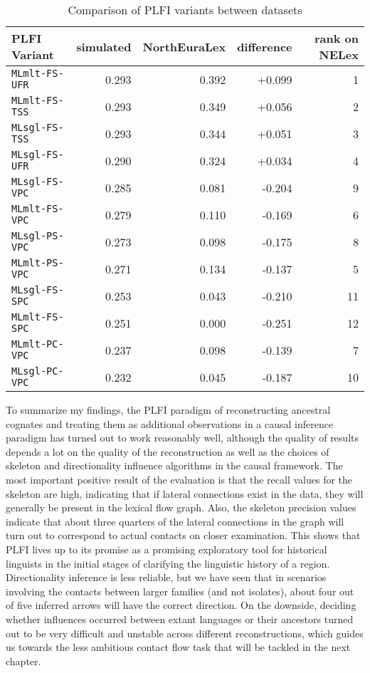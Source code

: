\begin{table}[t]
 \centering
 \begin{tabular}{lrrrr}
\hline \hline
PLFI Variant & simulated & NorthEuraLex & difference & rank on NELex\\ \hline
\texttt{MLmlt-FS-UFR} & 0.293 & 0.392 & +0.099 & 1\\  
\texttt{MLmlt-FS-TSS} & 0.293 & 0.349 & +0.056 & 2\\
\texttt{MLsgl-FS-TSS} & 0.293 & 0.344 & +0.051 & 3\\
\texttt{MLsgl-FS-UFR} & 0.290 & 0.324 & +0.034 & 4\\
\texttt{MLsgl-FS-VPC} & 0.285 & 0.081 & -0.204 & 9\\
\texttt{MLmlt-FS-VPC} & 0.279 & 0.110 & -0.169 & 6\\
\texttt{MLsgl-PS-VPC} & 0.273 & 0.098 & -0.175 & 8\\
\texttt{MLmlt-PS-VPC} & 0.271 & 0.134 & -0.137 & 5\\
\texttt{MLsgl-FS-SPC} & 0.253 & 0.043 & -0.210 & 11\\
\texttt{MLmlt-FS-SPC} & 0.251 & 0.000 & -0.251 & 12\\
\texttt{MLmlt-PC-VPC} & 0.237 & 0.098 & -0.139 & 7\\
\texttt{MLsgl-PC-VPC} & 0.232 & 0.045 & -0.187 & 10\\
  \hline
 \end{tabular}
 \caption{Comparison of PLFI variants between datasets}
 \label{variant-comparison-simulated-and-nelex}
\end{table}

To summarize my findings, the PLFI paradigm of reconstructing ancestral cognates and treating them as additional observations in a causal inference paradigm has turned out to work reasonably well, although the quality of results depends a lot on the quality of the reconstruction as well as the choices of skeleton and directionality influence algorithms in the causal framework. The most important positive result of the evaluation is that the recall values for the skeleton are high, indicating that if lateral connections exist in the data, they will generally be present in the lexical flow graph. Also, the skeleton precision values indicate that about three quarters of the lateral connections in the graph will turn out to correspond to actual contacts on closer examination. This shows that PLFI lives up to its promise as a promising exploratory tool for historical linguists in the initial stages of clarifying the linguistic history of a region. Directionality inference is less reliable, but we have seen that in scenarios involving the contacts between larger families (and not isolates), about four out of five inferred arrows will have the correct direction. On the downside, deciding whether influences occurred between extant languages or their ancestors turned out to be very difficult and unstable across different reconstructions, which guides us towards the less ambitious contact flow task that will be tackled in the next chapter.
